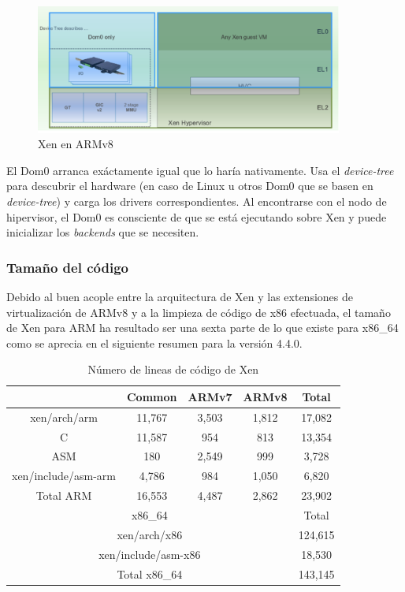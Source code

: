 \begin{figure}[!h]
  \centering
  \includegraphics[width=0.90\textwidth]{recursos/xen_3.png}
  \caption{Xen en ARMv8}
  \label{fig:xen_3}
\end{figure}

El Dom0 arranca exáctamente igual que lo haría nativamente. Usa el \textit{device-tree} para descubrir el hardware (en caso de Linux u otros Dom0 que se basen en \textit{device-tree}) y carga los drivers correspondientes. Al encontrarse con el nodo de hipervisor, el Dom0 es consciente de que se está ejecutando sobre Xen y puede inicializar los \textit{backends} que se necesiten.

\subsubsection{Tamaño del código}

Debido al buen acople entre la arquitectura de Xen y las extensiones de virtualización de ARMv8 y a la limpieza de código de x86 efectuada, el tamaño de Xen para ARM ha resultado ser una sexta parte de lo que existe para x86\_64 como se aprecia en el siguiente resumen para la versión 4.4.0.

\begin{table}[htb]

	\label{table:results45}
  \centering

	\begin{tabular}{ |c|c|c|c|c| }
		\hline
     & Common & ARMv7 & ARMv8 & Total\\
    \hline
    xen/arch/arm          & 11,767      & 3,503  & 1,812   & 17,082 \\
    C                     & 11,587      & 954    & 813	    & 13,354 \\
    ASM                   & 180         & 2,549  & 999     & 3,728  \\
    xen/include/asm-arm   & 4,786       & 984    & 1,050   & 6,820  \\
    Total ARM	            & 16,553  & 4,487  & 2,862        & 23,902 \\
    \multicolumn{4}{|c|}{x86\_64}                           & Total\\
    \multicolumn{4}{|c|}{xen/arch/x86}                      & 124,615\\
    \multicolumn{4}{|c|}{xen/include/asm-x86}               & 18,530 \\
    \multicolumn{4}{|c|}{Total x86\_64}                     & 143,145\\
	\end{tabular}
	\caption{Número de lineas de código de Xen}

\end{table}

